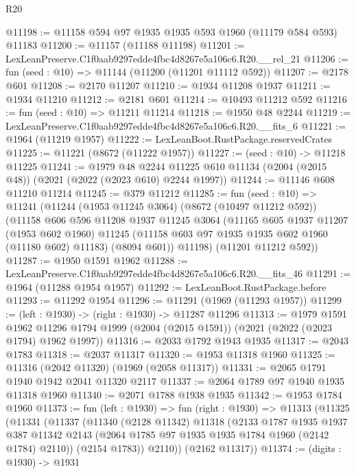 \begin{lexlean}{R20}
\begin{coremodule}
@11198 := @11158 @594 @97 @1935 @1935 @593 @1960 (@11179 @584 @593) @11183
@11200 := @11157 (@11188 @11198)
@11201 := LexLeanPreserve.C1f0aab9297edde4fbc4d8267e5a106c6.R20.__rel_21
@11206 := fun (seed : @10) => @11144 (@11200 (@11201 @11112 @592))
@11207 := @2178 @601
@11208 := @2170 @11207
@11210 := @1934 @11208 @1937
@11211 := @1934 @11210
@11212 := @2181 @601
@11214 := @10493 @11212 @592
@11216 := fun (seed : @10) => @11211 @11214
@11218 := @1950 @48 @2244
@11219 := LexLeanPreserve.C1f0aab9297edde4fbc4d8267e5a106c6.R20.__fits_6
@11221 := @1964 (@11219 @1957)
@11222 := LexLeanBoot.RustPackage.reservedCrates
@11225 := @11221 (@8672 (@11222 @1957))
@11227 := (seed : @10) -> @11218 @11225
@11241 := @1979
    @48
    @2244
    @11225
    @610
    @11134
    (@2004 (@2015 @48))
    (@2021 (@2022 (@2023 @610) @2244 @1997))
@11244 := @11146 @608 @11210 @11214
@11245 := @379 @11212
@11285 := fun (seed : @10) =>
  @11241
    (@11244
      (@1953 @11245 @3064)
      (@8672 (@10497 @11212 @592))
      (@11158
        @606
        @596
        @11208
        @1937
        @11245
        @3064
        (@11165
          @605
          @1937
          @11207
          (@1953 @602 @1960)
          @11245
          (@11158 @603 @97 @1935 @1935 @602 @1960 (@11180 @602) @11183)
          (@8094 @601))
        @11198)
      (@11201 @11212 @592))
@11287 := @1950 @1591 @1962
@11288 := LexLeanPreserve.C1f0aab9297edde4fbc4d8267e5a106c6.R20.__fits_46
@11291 := @1964 (@11288 @1954 @1957)
@11292 := LexLeanBoot.RustPackage.before
@11293 := @11292 @1954
@11296 := @11291 (@1969 (@11293 @1957))
@11299 := (left : @1930) -> (right : @1930) -> @11287 @11296
@11313 := @1979
    @1591
    @1962
    @11296
    @1794
    @1999
    (@2004 (@2015 @1591))
    (@2021 (@2022 (@2023 @1794) @1962 @1997))
@11316 := @2033 @1792 @1943 @1935
@11317 := @2043 @1783
@11318 := @2037 @11317
@11320 := @1953 @11318 @1960
@11325 := @11316 (@2042 @11320) (@1969 (@2058 @11317))
@11331 := @2065 @1791 @1940 @1942 @2041 @11320 @2117
@11337 := @2064 @1789 @97 @1940 @1935 @11318 @1960
@11340 := @2071 @1788 @1938 @1935
@11342 := @1953 @1784 @1960
@11373 := fun (left : @1930) =>
  fun (right : @1930) =>
  @11313
    (@11325
      (@11331
        (@11337
          (@11340
            (@2128 @11342)
            @11318
            (@2133
              @1787
              @1935
              @1937
              @387
              @11342
              @2143
              (@2064 @1785 @97 @1935 @1935 @1784 @1960 (@2142 @1784) @2110))
            (@2154 @1783))
          @2110))
      (@2162 @11317))
@11374 := (digits : @1930) -> @1931

\end{coremodule}
\end{lexlean}
